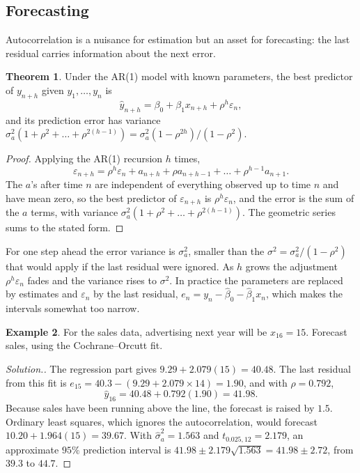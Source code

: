 \documentclass[11pt,a4paper]{article}
\numberwithin{equation}{section}
\theoremstyle{definition}
\newtheorem{thm}{Theorem}[subsection]
\newtheorem{exa}[thm]{Example}
\newenvironment{solution}
  {\renewcommand{\qedsymbol}{}\begin{proof}[\textit{Solution}.]}
  {\end{proof}}
\begin{document}
\subsection{Forecasting}
Autocorrelation is a nuisance for estimation but an asset for forecasting: the last residual carries
information about the next error.

\begin{thm}\label{thm:ar-forecast}
Under the AR(1) model with known parameters, the best predictor of $y_{n+h}$ given $y_1, \dots, y_n$ is
\[
\hat y_{n+h} = \beta_0 + \beta_1x_{n+h} + \rho^h\varepsilon_n ,
\]
and its prediction error has variance $\sigma_a^2(1 + \rho^2 + \dots + \rho^{2(h-1)}) = \sigma_a^2(1 - \rho^{2h})/(1 - \rho^2)$.
\end{thm}

\begin{proof}
Applying the AR(1) recursion $h$ times,
\[
\varepsilon_{n+h} = \rho^h\varepsilon_n + a_{n+h} + \rho a_{n+h-1} + \dots + \rho^{h-1}a_{n+1} .
\]
The $a$'s after time $n$ are independent of everything observed up to time $n$ and have mean zero, so the best
predictor of $\varepsilon_{n+h}$ is $\rho^h\varepsilon_n$, and the error is the sum of the $a$ terms, with variance
$\sigma_a^2(1 + \rho^2 + \dots + \rho^{2(h-1)})$. The geometric series sums to the stated form.
\end{proof}

For one step ahead the error variance is $\sigma_a^2$, smaller than the $\sigma^2 = \sigma_a^2/(1 - \rho^2)$ that would apply if the last
residual were ignored. As $h$ grows the adjustment $\rho^h\varepsilon_n$ fades and the variance rises to $\sigma^2$. In practice the
parameters are replaced by estimates and $\varepsilon_n$ by the last residual, $e_n = y_n - \hat\beta_0 - \hat\beta_1x_n$, which makes the
intervals somewhat too narrow.

\begin{exa}\label{exa:sales-forecast}
For the sales data, advertising next year will be $x_{16} = 15$. Forecast sales, using the Cochrane--Orcutt fit.
\end{exa}

\begin{solution}
The regression part gives $9.29 + 2.079(15) = 40.48$. The last residual from this fit is
$e_{15} = 40.3 - (9.29 + 2.079 \times 14) = 1.90$, and with $\hat\rho = 0.792$,
\[
\hat y_{16} = 40.48 + 0.792(1.90) = 41.98 .
\]
Because sales have been running above the line, the forecast is raised by $1.5$. Ordinary least squares, which
ignores the autocorrelation, would forecast $10.20 + 1.964(15) = 39.67$. With $\hat\sigma_a^2 = 1.563$ and $t_{0.025,12} = 2.179$, an
approximate $95\%$ prediction interval is $41.98 \pm 2.179\sqrt{1.563} = 41.98 \pm 2.72$, from $39.3$ to $44.7$.
\end{solution}
\end{document}

